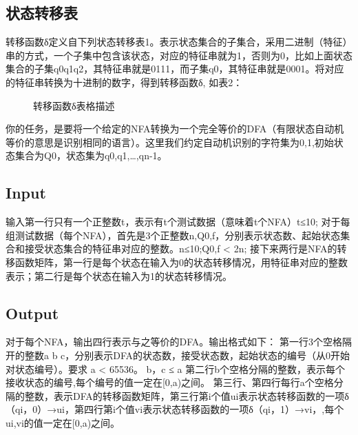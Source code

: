 \subsection{状态转移表}
转移函数δ定义自下列状态转移表1。表示状态集合的子集合，采用二进制（特征）串的方式，一个子集中包含该状态，对应的特征串就为1，否则为0，比如上面状态集合的子集{q0q1q2}，其特征串就是0111，而子集{q0}，其特征串就是0001。将对应的特征串转换为十进制的数字，得到转移函数δ, 如表2：
\begin{figure}[htbp]
	\centering
	\caption{转移函数δ表格描述}
	\label{fig:subfigure}
\end{figure}
你的任务，是要将一个给定的NFA转换为一个完全等价的DFA（有限状态自动机等价的意思是识别相同的语言）。这里我们约定自动机识别的字符集为{0,1},初始状态集合为Q0，状态集为{q0,q1,…,qn-1}。

\subsection{Input}
输入第一行只有一个正整数t，表示有t个测试数据（意味着t个NFA）t≤10;
对于每组测试数据（每个NFA），首先是3个正整数n,Q0,f，分别表示状态数、起始状态集合和接受状态集合的特征串对应的整数。n≤10;Q0,f < 2n;
接下来两行是NFA的转移函数矩阵，第一行是每个状态在输入为0的状态转移情况，用特征串对应的整数表示；第二行是每个状态在输入为1的状态转移情况。


\subsection{Output}
对于每个NFA，输出四行表示与之等价的DFA。输出格式如下：
第一行3个空格隔开的整数a b c，分别表示DFA的状态数，接受状态数，起始状态的编号（从0开始对状态编号）。要求 a < 65536。
b，c ≤ a 第二行b个空格分隔的整数，表示每个接收状态的编号,每个编号的值一定在[0,a)之间。
第三行、第四行每行a个空格分隔的整数，表示DFA的转移函数矩阵，第三行第i个值ui表示状态转移函数的一项δ（qi，0）→ui，第四行第i个值vi表示状态转移函数的一项δ（qi，1）→vi，,每个ui,vi的值一定在[0,a)之间。

